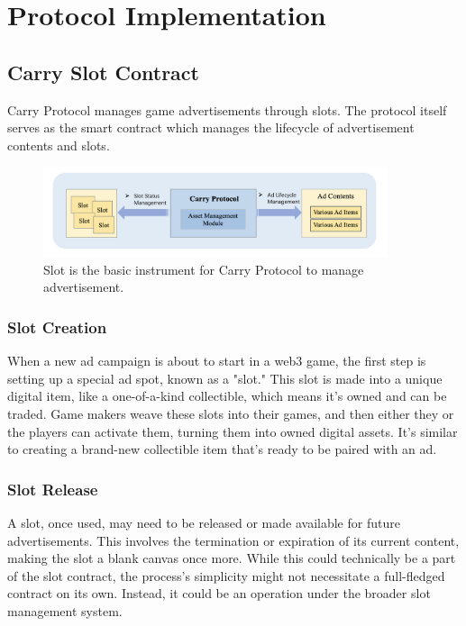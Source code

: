 \section{Protocol Implementation}

\subsection{Carry Slot Contract}

Carry Protocol manages game advertisements through slots. The protocol itself serves as the smart contract which manages the lifecycle of advertisement contents and slots.
\begin{figure}[!htb]
    \centering
    \includegraphics[width=0.9\textwidth]{slotexplain.png}
    \caption{Slot is the basic instrument for Carry Protocol to manage advertisement.}
    \label{fig:slotexplain}
\end{figure}

\subsubsection{Slot Creation}

When a new ad campaign is about to start in a web3 game, the first step is setting up a special ad spot, known as a "slot." This slot is made into a unique digital item, like a one-of-a-kind collectible, which means it's owned and can be traded. Game makers weave these slots into their games, and then either they or the players can activate them, turning them into owned digital assets. It's similar to creating a brand-new collectible item that's ready to be paired with an ad.

\subsubsection{Slot Release}

A slot, once used, may need to be released or made available for future advertisements. This involves the termination or expiration of its current content, making the slot a blank canvas once more. While this could technically be a part of the slot contract, the process's simplicity might not necessitate a full-fledged contract on its own. Instead, it could be an operation under the broader slot management system.


